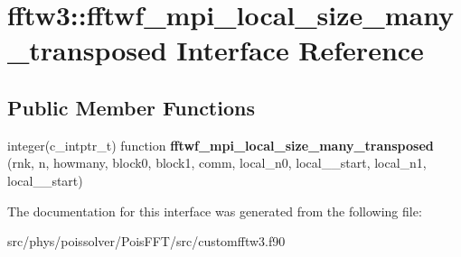 \hypertarget{interfacefftw3_1_1fftwf__mpi__local__size__many__transposed}{}\section{fftw3\+:\+:fftwf\+\_\+mpi\+\_\+local\+\_\+size\+\_\+many\+\_\+transposed Interface Reference}
\label{interfacefftw3_1_1fftwf__mpi__local__size__many__transposed}
\subsection*{Public Member Functions}
\begin{DoxyCompactItemize}
\item 
integer(c\+\_\+intptr\+\_\+t) function {\bfseries fftwf\+\_\+mpi\+\_\+local\+\_\+size\+\_\+many\+\_\+transposed} (rnk, n, howmany, block0, block1, comm, local\+\_\+n0, local\+\_\+\_\+start, local\+\_\+n1, local\+\_\+\_\+start)\hypertarget{interfacefftw3_1_1fftwf__mpi__local__size__many__transposed_aa273c2a784c3aac3090b7a6650dc4009}{}\label{interfacefftw3_1_1fftwf__mpi__local__size__many__transposed_aa273c2a784c3aac3090b7a6650dc4009}

\end{DoxyCompactItemize}


The documentation for this interface was generated from the following file\+:\begin{DoxyCompactItemize}
\item 
src/phys/poissolver/\+Pois\+F\+F\+T/src/customfftw3.\+f90\end{DoxyCompactItemize}
